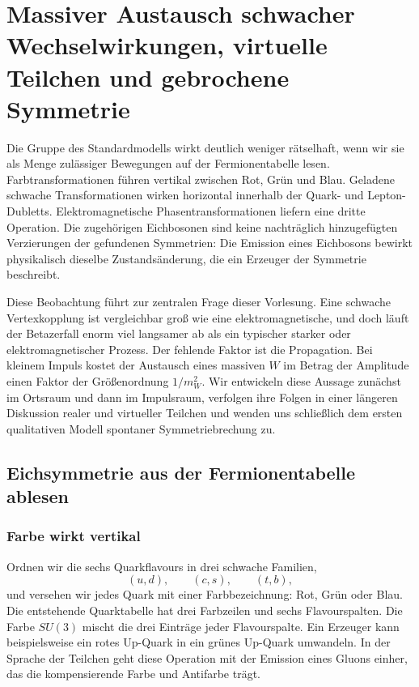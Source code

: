 \chapter{Massiver Austausch schwacher Wechselwirkungen, virtuelle Teilchen und gebrochene Symmetrie}

Die Gruppe des Standardmodells wirkt deutlich weniger rätselhaft, wenn wir sie als Menge zulässiger Bewegungen auf der Fermionentabelle lesen. Farbtransformationen führen vertikal zwischen Rot, Grün und Blau. Geladene schwache Transformationen wirken horizontal innerhalb der Quark- und Lepton-Dubletts. Elektromagnetische Phasentransformationen liefern eine dritte Operation. Die zugehörigen Eichbosonen sind keine nachträglich hinzugefügten Verzierungen der gefundenen Symmetrien: Die Emission eines Eichbosons bewirkt physikalisch dieselbe Zustandsänderung, die ein Erzeuger der Symmetrie beschreibt.

Diese Beobachtung führt zur zentralen Frage dieser Vorlesung. Eine schwache Vertexkopplung ist vergleichbar groß wie eine elektromagnetische, und doch läuft der Betazerfall enorm viel langsamer ab als ein typischer starker oder elektromagnetischer Prozess. Der fehlende Faktor ist die Propagation. Bei kleinem Impuls kostet der Austausch eines massiven \(W\) im Betrag der Amplitude einen Faktor der Größenordnung \(1/m_W^2\). Wir entwickeln diese Aussage zunächst im Ortsraum und dann im Impulsraum, verfolgen ihre Folgen in einer längeren Diskussion realer und virtueller Teilchen und wenden uns schließlich dem ersten qualitativen Modell spontaner Symmetriebrechung zu.

\section{Eichsymmetrie aus der Fermionentabelle ablesen}

\subsection{Farbe wirkt vertikal}

Ordnen wir die sechs Quarkflavours in drei schwache Familien,
\begin{equation}
  (u,d),\qquad(c,s),\qquad(t,b),
\end{equation}
und versehen wir jedes Quark mit einer Farbbezeichnung: Rot, Grün oder Blau. Die entstehende Quarktabelle hat drei Farbzeilen und sechs Flavourspalten. Die Farbe \(SU(3)\) mischt die drei Einträge jeder Flavourspalte. Ein Erzeuger kann beispielsweise ein rotes Up-Quark in ein grünes Up-Quark umwandeln. In der Sprache der Teilchen geht diese Operation mit der Emission eines Gluons einher, das die kompensierende Farbe und Antifarbe trägt.

